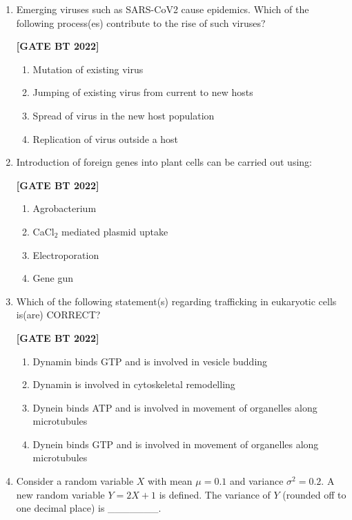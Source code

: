\documentclass[12pt]{article}
\begin{document}
\begin{enumerate}[leftmargin=2.5em, label=\textbf{Q.\arabic*}., itemsep=2em, resume]
\item Emerging viruses such as SARS-CoV2 cause epidemics. Which of the following process(es) contribute to the rise of such viruses?

\noindent \textbf{[GATE BT 2022]}
\begin{multicols}{2}
\begin{enumerate}
    \item Mutation of existing virus
    \item Jumping of existing virus from current to new hosts
    \item Spread of virus in the new host population
    \item Replication of virus outside a host
\end{enumerate}
\end{multicols}

\item Introduction of foreign genes into plant cells can be carried out using:

\noindent \textbf{[GATE BT 2022]}
\begin{multicols}{2}
\begin{enumerate}
    \item Agrobacterium
    \item CaCl$_2$ mediated plasmid uptake
    \item Electroporation
    \item Gene gun
\end{enumerate}
\end{multicols}

\item Which of the following statement(s) regarding trafficking in eukaryotic cells is(are) CORRECT?

\noindent \textbf{[GATE BT 2022]}
\begin{multicols}{2}
\begin{enumerate}
    \item Dynamin binds GTP and is involved in vesicle budding
    \item Dynamin is involved in cytoskeletal remodelling
    \item Dynein binds ATP and is involved in movement of organelles along microtubules
    \item Dynein binds GTP and is involved in movement of organelles along microtubules
\end{enumerate}
\end{multicols}

\item Consider a random variable $X$ with mean $\mu = 0.1$ and variance $\sigma^2 = 0.2$.  
A new random variable $Y = 2X + 1$ is defined.  
The variance of $Y$ (rounded off to one decimal place) is \_\_\_\_\_\_\_.


\end{enumerate}
\end{document}
